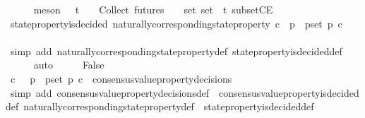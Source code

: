 \begin{isabellebody}
\ \ \ \ \isamarkupfalse%
\ {\isacharparenleft}meson\ {\isacartoucheopen}{\isasymsigma}{\isacharprime}\ {\isasymin}\ {\isasymSigma}t\ {\isasymand}\ {\isasymsigma}{\isacharprime}\ {\isasymin}\ {\isasymInter}{\isacharunderscore}Collect\ {\isacharparenleft}futures\ {\isasymsigma}{\isacharparenright}\ {\isacharparenleft}{\isasymsigma}\ {\isasymin}\ {\isasymsigma}{\isacharunderscore}set{\isacharparenright}{\isacartoucheclose}\ {\isacartoucheopen}{\isasymsigma}{\isacharunderscore}set\ {\isasymsubseteq}\ {\isasymSigma}t{\isacartoucheclose}\ subsetCE{\isacharparenright}\isanewline
\ \ \isamarkupfalse%
\ {\isachardoublequoteopen}state{\isacharunderscore}property{\isacharunderscore}is{\isacharunderscore}decided\ {\isacharparenleft}naturally{\isacharunderscore}corresponding{\isacharunderscore}state{\isacharunderscore}property\ {\isacharparenleft}{\isasymlambda}c{\isachardot}\ {\isasymforall}\ p\ {\isasymin}\ p{\isacharunderscore}set{\isachardot}\ p\ c{\isacharparenright}{\isacharcomma}\ {\isasymsigma}{\isacharprime}{\isacharparenright}{\isachardoublequoteclose}\isanewline
\ \ \ \ \isamarkupfalse%
\ {\isacharparenleft}simp\ add{\isacharcolon}\ naturally{\isacharunderscore}corresponding{\isacharunderscore}state{\isacharunderscore}property{\isacharunderscore}def\ state{\isacharunderscore}property{\isacharunderscore}is{\isacharunderscore}decided{\isacharunderscore}def{\isacharparenright}\isanewline
\ \ \ \ \isamarkupfalse%
\ auto\isanewline
\ \ \isamarkupfalse%
\ \isamarkupfalse%
\ False\isanewline
\ \ \ \ \isamarkupfalse%
\ {\isacartoucheopen}{\isacharparenleft}{\isasymlambda}c{\isachardot}\ {\isasymnot}\ {\isacharparenleft}{\isasymforall}\ p\ {\isasymin}\ p{\isacharunderscore}set{\isachardot}\ p\ c{\isacharparenright}{\isacharparenright}\ {\isasymin}\ consensus{\isacharunderscore}value{\isacharunderscore}property{\isacharunderscore}decisions\ {\isasymsigma}{\isacartoucheclose}\ \isanewline
\ \ \ \ \isamarkupfalse%
\ {\isacharparenleft}simp\ add{\isacharcolon}\ consensus{\isacharunderscore}value{\isacharunderscore}property{\isacharunderscore}decisions{\isacharunderscore}def\ \ consensus{\isacharunderscore}value{\isacharunderscore}property{\isacharunderscore}is{\isacharunderscore}decided{\isacharunderscore}def\ naturally{\isacharunderscore}corresponding{\isacharunderscore}state{\isacharunderscore}property{\isacharunderscore}def\ \ state{\isacharunderscore}property{\isacharunderscore}is{\isacharunderscore}decided{\isacharunderscore}def{\isacharparenright}\isanewline

\end{isabellebody}
